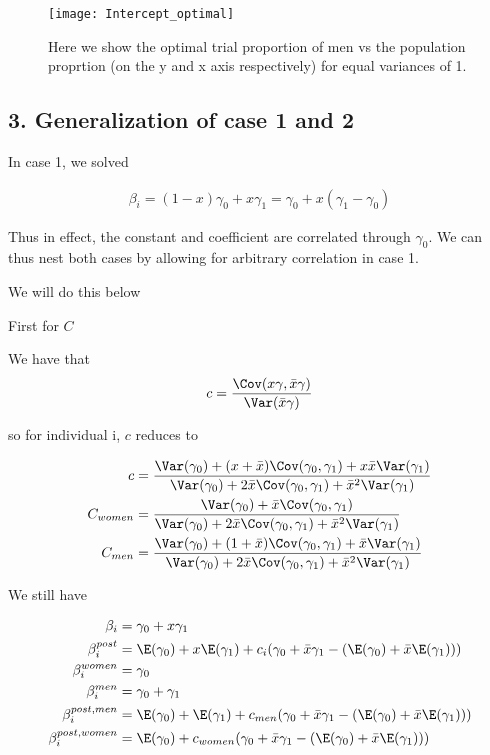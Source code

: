 \begin{figure}[ht!]
\label{fig:v2-intercept-optim}
  \centering
	\texttt{[image: Intercept\_optimal]}
	\caption{Here we show the optimal trial proportion of men vs the population proprtion (on the y and x axis respectively) for equal variances of 1.} 
\end{figure}

\subsection*{3. Generalization of case 1 and 2}

In case 1, we solved 

\begin{align*}
	\beta_i = (1 - x) \gamma_0 + x \gamma_1 = \gamma_0 + x(\gamma_1 - \gamma_0)
\end{align*} 

Thus in effect, the constant and coefficient are correlated through $\gamma_0$. We can thus nest both cases by allowing for arbitrary correlation in case 1.


We will do this below

First for $C$ 

We have that
\begin{align*}
	c = \frac{\Cov (x \gamma, \bar{x} \gamma)}{ \Var( \bar{x} \gamma )}
\end{align*} 

so for individual i, $c$ reduces to

\begin{align*}
		c &= \frac{\Var(\gamma_0) + (x + \bar{x}) \Cov(\gamma_0, \gamma_1) + x \bar{x} \Var(\gamma_1)}{\Var(\gamma_0) + 2 \bar{x} \Cov(\gamma_0, \gamma_1) + \bar{x}^2\Var(\gamma_1)} \\
		C_{women} &= \frac{\Var(\gamma_0) + \bar{x} \Cov(\gamma_0, \gamma_1)}{\Var(\gamma_0) + 2 \bar{x} \Cov(\gamma_0, \gamma_1) + \bar{x}^2\Var(\gamma_1)} \\
	C_{men} &= \frac{\Var(\gamma_0) + (1 + \bar{x}) \Cov(\gamma_0, \gamma_1) + \bar{x} \Var(\gamma_1)}{\Var(\gamma_0) + 2 \bar{x} \Cov(\gamma_0, \gamma_1) + \bar{x}^2\Var(\gamma_1)} \\
\end{align*} 

We still have

\begin{align*}
	\beta_i &= \gamma_0 + x \gamma_1 \\
	\beta_{i}^{post} &= \E(\gamma_0) + x \E(\gamma_1)  + c_i ( \gamma_0 + \bar{x} \gamma_1 - (\E(\gamma_0) + \bar{x} \E(\gamma_1))) \\
	\beta_i^{women} &= \gamma_0 \\
	\beta_i^{men} &= \gamma_0 + \gamma_1 \\
	\beta_i^{post,men} &= \E(\gamma_0) + \E(\gamma_1)  + c_{men} ( \gamma_0 + \bar{x} \gamma_1 - (\E(\gamma_0) + \bar{x} \E(\gamma_1))) \\
	\beta_i^{post, women} &= \E(\gamma_0) +  c_{women} ( \gamma_0 + \bar{x} \gamma_1 - (\E(\gamma_0) + \bar{x} \E(\gamma_1))) \\
\end{align*} 

